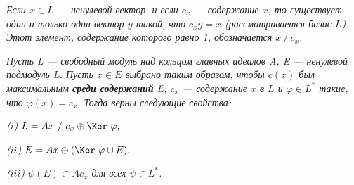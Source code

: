\begin{determ}
\hspace*{0.5cm}

\textit{Если $x \in L$ — ненулевой вектор, и если $c_x$ — содержание $x$, то существует один и только один вектор $y$ такой, что $c_xy = x$ (рассматривается базис $L$). Этот элемент, содержание которого равно 1, обозначается $x~/~ c_x$.}
\end{determ}
\begin{lemma}
\hspace*{0.5cm}

\textit{Пусть L — свободный модуль над кольцом главных идеалов A, E — ненулевой подмодуль L. Пусть $x \in E$ выбрано таким образом, чтобы $c(x)$ был максимальным \textbf{среди содержаний} E; $c_x$ — содержание $x$ в $L$ и $\varphi \in L^{*}$ такие, что $\varphi(x) = c_x.$ Тогда верны следующие свойства:\\}

\textit{($i$) $L = Ax~/~c_x \oplus \Ker~\varphi,$}

\textit{($ii$) $E = Ax \oplus (\Ker~\varphi \cup E),$}

\textit{($iii$) $\psi(E) \subset Ac_x$ для всех $\psi \in L^{*}$.\\\\\\}
\end{lemma}

